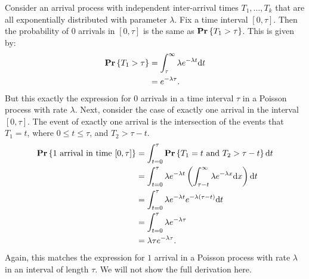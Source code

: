 Consider an arrival process with independent inter-arrival times $T_1, \ldots, T_k$ that are all exponentially distributed with
parameter $\lambda$. Fix a time interval $[0, \tau]$. Then the probability of $0$ arrivals in $[0, \tau]$ is the same as
$\mathbf{Pr} \left \{ T_1 > \tau \right \}$. This is given by:
\begin{align*}
\mathbf{Pr} \left \{ T_1 > \tau \right \} & = \int_{\tau}^{\infty} \lambda e^{- \lambda t} \text{d} t \\
        & = e^{- \lambda \tau}.
\end{align*}
But this exactly the expression for $0$ arrivals in a time interval $\tau$ in a Poisson process with rate $\lambda$. Next, consider
the case of exactly one arrival in the interval $[0, \tau]$. The event of exactly one arrival is the intersection
of the events that $T_1 = t$, where $0 \leq t \leq \tau$, and $T_2 > \tau - t$.
\begin{align*}
    \mathbf{Pr} \left \{ 1 \text{ arrival in time } [0, \tau] \right \} & = \int_{t = 0}^{\tau} \mathbf{Pr} \left \{ T_1 = t \text{ and } T_2 > \tau - t \right \} \text{d} t \\
        & = \int_{t = 0}^{\tau} \lambda e^{- \lambda t} \left ( \int_{\tau - t}^{\infty} \lambda e^{-\lambda x } \text{d} x \right ) \text{d} t \\
        & = \int_{t = 0}^{\tau} \lambda e^{- \lambda t} e^{- \lambda (\tau - t)} \text{d} t \\
        & = \int_{t = 0}^{\tau} \lambda e^{- \lambda \tau} \\
        & = \lambda \tau e^{- \lambda \tau}.
\end{align*}
Again, this matches the expression for $1$ arrival in a Poisson process with rate $\lambda$ in an interval of length $\tau$. We will 
not show the full derivation here.

